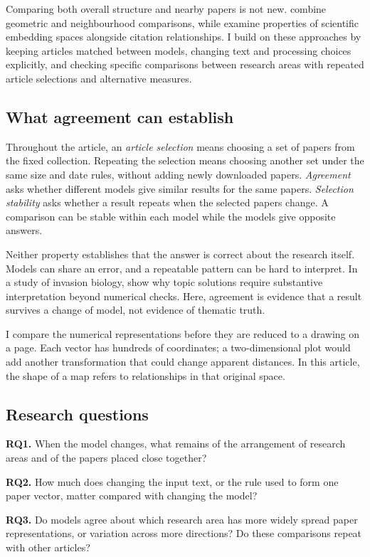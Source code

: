 \documentclass[12pt]{article}
\begin{document}
Comparing both overall structure and nearby papers is not new. \citet{ref4e1e0d5582} combine geometric and neighbourhood comparisons, while \citet{ref6da178065c} examine properties of scientific embedding spaces alongside citation relationships. I build on these approaches by keeping articles matched between models, changing text and processing choices explicitly, and checking specific comparisons between research areas with repeated article selections and alternative measures.

\subsection{What agreement can establish}
Throughout the article, an \emph{article selection} means choosing a set of papers from the fixed collection. Repeating the selection means choosing another set under the same size and date rules, without adding newly downloaded papers. \emph{Agreement} asks whether different models give similar results for the same papers. \emph{Selection stability} asks whether a result repeats when the selected papers change. A comparison can be stable within each model while the models give opposite answers.

Neither property establishes that the answer is correct about the research itself. Models can share an error, and a repeatable pattern can be hard to interpret. In a study of invasion biology, \citet{QSSreviewQ17} show why topic solutions require substantive interpretation beyond numerical checks. Here, agreement is evidence that a result survives a change of model, not evidence of thematic truth.

I compare the numerical representations before they are reduced to a drawing on a page. Each vector has hundreds of coordinates; a two-dimensional plot would add another transformation that could change apparent distances. In this article, the shape of a map refers to relationships in that original space.

\subsection{Research questions}
\textbf{RQ1.} When the model changes, what remains of the arrangement of research areas and of the papers placed close together?

\textbf{RQ2.} How much does changing the input text, or the rule used to form one paper vector, matter compared with changing the model?

\textbf{RQ3.} Do models agree about which research area has more widely spread paper representations, or variation across more directions? Do these comparisons repeat with other articles?
\end{document}

